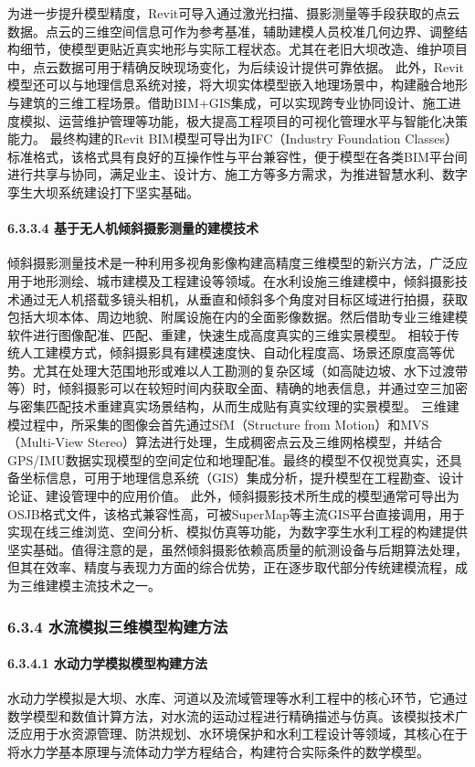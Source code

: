 为进一步提升模型精度，Revit可导入通过激光扫描、摄影测量等手段获取的点云数据。点云的三维空间信息可作为参考基准，辅助建模人员校准几何边界、调整结构细节，使模型更贴近真实地形与实际工程状态。尤其在老旧大坝改造、维护项目中，点云数据可用于精确反映现场变化，为后续设计提供可靠依据。 此外，Revit模型还可以与地理信息系统对接，将大坝实体模型嵌入地理场景中，构建融合地形与建筑的三维工程场景。借助BIM+GIS集成，可以实现跨专业协同设计、施工进度模拟、运营维护管理等功能，极大提高工程项目的可视化管理水平与智能化决策能力。 最终构建的Revit BIM模型可导出为IFC（Industry Foundation Classes）标准格式，该格式具有良好的互操作性与平台兼容性，便于模型在各类BIM平台间进行共享与协同，满足业主、设计方、施工方等多方需求，为推进智慧水利、数字孪生大坝系统建设打下坚实基础。 \paragraph{6.3.3.4 基于无人机倾斜摄影测量的建模技术}\label{ux57faux4e8eux65e0ux4ebaux673aux503eux659cux6444ux5f71ux6d4bux91cfux7684ux5efaux6a21ux6280ux672f} 倾斜摄影测量技术是一种利用多视角影像构建高精度三维模型的新兴方法，广泛应用于地形测绘、城市建模及工程建设等领域。在水利设施三维建模中，倾斜摄影技术通过无人机搭载多镜头相机，从垂直和倾斜多个角度对目标区域进行拍摄，获取包括大坝本体、周边地貌、附属设施在内的全面影像数据。然后借助专业三维建模软件进行图像配准、匹配、重建，快速生成高度真实的三维实景模型。 相较于传统人工建模方式，倾斜摄影具有建模速度快、自动化程度高、场景还原度高等优势。尤其在处理大范围地形或难以人工勘测的复杂区域（如高陡边坡、水下过渡带等）时，倾斜摄影可以在较短时间内获取全面、精确的地表信息，并通过空三加密与密集匹配技术重建真实场景结构，从而生成贴有真实纹理的实景模型。 三维建模过程中，所采集的图像会首先通过SfM（Structure from Motion）和MVS（Multi-View Stereo）算法进行处理，生成稠密点云及三维网格模型，并结合GPS/IMU数据实现模型的空间定位和地理配准。最终的模型不仅视觉真实，还具备坐标信息，可用于地理信息系统（GIS）集成分析，提升模型在工程勘查、设计论证、建设管理中的应用价值。 此外，倾斜摄影技术所生成的模型通常可导出为OSJB格式文件，该格式兼容性高，可被SuperMap等主流GIS平台直接调用，用于实现在线三维浏览、空间分析、模拟仿真等功能，为数字孪生水利工程的构建提供坚实基础。值得注意的是，虽然倾斜摄影依赖高质量的航测设备与后期算法处理，但其在效率、精度与表现力方面的综合优势，正在逐步取代部分传统建模流程，成为三维建模主流技术之一。 \subsubsection{6.3.4 水流模拟三维模型构建方法}\label{ux6c34ux6d41ux6a21ux62dfux4e09ux7ef4ux6a21ux578bux6784ux5efaux65b9ux6cd5} \paragraph{6.3.4.1 水动力学模拟模型构建方法}\label{ux6c34ux52a8ux529bux5b66ux6a21ux62dfux6a21ux578bux6784ux5efaux65b9ux6cd5} 水动力学模拟是大坝、水库、河道以及流域管理等水利工程中的核心环节，它通过数学模型和数值计算方法，对水流的运动过程进行精确描述与仿真。该模拟技术广泛应用于水资源管理、防洪规划、水环境保护和水利工程设计等领域，其核心在于将水力学基本原理与流体动力学方程结合，构建符合实际条件的数学模型。 